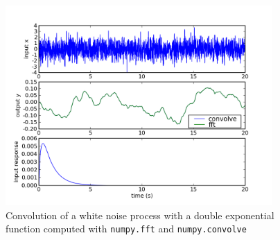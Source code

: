 



\begin{center}%
\begin{figure}
\begin{centering}\includegraphics[width=4in]{fig/convolution_demo}\par\end{centering}
\caption{\label{fig:convolution_demo}Convolution of a white noise process with a double exponential function computed with \texttt{numpy.fft} and \texttt{numpy.convolve}}
\end{figure}
\par\end{center}
